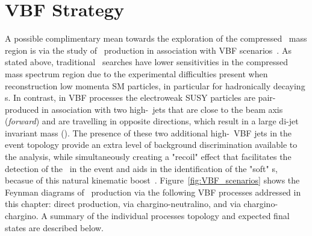 	\section{\acl{VBF} Strategy}
	\label{sec:vbfstrat}
	 A possible complimentary mean towards the exploration of the compressed \stau\ mass region is via the study of  \stau\ production in association with \ac{VBF} scenarios~\cite{vbf}.
	 As stated above, traditional \stau\ searches have lower sensitivities in the compressed mass spectrum region due to the experimental difficulties present when reconstruction low momenta \ac{SM} particles, in particular for hadronically decaying \ltau s.
	 In contrast, in \ac{VBF} processes the electroweak \ac{SUSY} particles are pair-produced in association with two high-\pt\ jets that are close to the beam axis (\textit{forward}) and are travelling in opposite directions, which result in a large di-jet invariant mass (\mjj).  
	 The presence of these two additional high-\pt\ \ac{VBF} jets in the event topology provide an extra level of background discrimination available to the analysis, while simultaneously creating a "recoil" effect that facilitates the detection of  the \met\ in the event and aids in the identification of the "soft" \ltau s, becasue of this natural kinematic boost~\cite{vbf_boost1,vbf_boost2}.
	 Figure~\ref{fig:VBF_scenarios} shows the Feynman diagrams of \stau\ production via the following \ac{VBF} processes addressed in this chapter: direct production, via chargino-neutralino, and via chargino-chargino. 
	 A summary of the individual processes topology and expected final states are described below.
	 \FeynmanDiagramsVBF
	 
